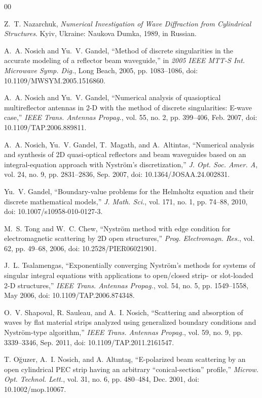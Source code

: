 \documentclass[conference]{IEEEtran}
\begin{document}
\begin{thebibliography}{00}

Z.~T. Nazarchuk, \emph{Numerical Investigation of Wave Diffraction from
Cylindrical Structures}. Kyiv, Ukraine: Naukova Dumka, 1989, in Russian.

A.~A. Nosich and Yu.~V. Gandel, ``Method of discrete singularities in the
accurate modeling of a reflector beam waveguide,'' in \emph{2005 IEEE MTT-S
Int. Microwave Symp. Dig.}, Long Beach, 2005, pp. 1083--1086,
doi: 10.1109/MWSYM.2005.1516860.

A.~A. Nosich and Yu.~V. Gandel, ``Numerical analysis of quasioptical
multireflector antennas in 2-D with the method of discrete singularities:
E-wave case,'' \emph{IEEE Trans. Antennas Propag.}, vol. 55, no. 2,
pp. 399--406, Feb. 2007, doi: 10.1109/TAP.2006.889811.

A.~A. Nosich, Yu.~V. Gandel, T.~Magath, and A.~Altintas, ``Numerical analysis
and synthesis of 2D quasi-optical reflectors and beam waveguides based on an
integral-equation approach with Nystr\"om's discretization,'' \emph{J. Opt.
Soc. Amer. A}, vol. 24, no. 9, pp. 2831--2836, Sep. 2007,
doi: 10.1364/JOSAA.24.002831.

Yu.~V. Gandel, ``Boundary-value problems for the Helmholtz equation and their
discrete mathematical models,'' \emph{J. Math. Sci.}, vol. 171, no. 1,
pp. 74--88, 2010, doi: 10.1007/s10958-010-0127-3.

M.~S. Tong and W.~C. Chew, ``Nystr\"om method with edge condition for
electromagnetic scattering by 2D open structures,'' \emph{Prog. Electromagn.
Res.}, vol. 62, pp. 49--68, 2006, doi: 10.2528/PIER06021901.

J.~L. Tsalamengas, ``Exponentially converging Nystr\"om's methods for systems
of singular integral equations with applications to open/closed strip- or
slot-loaded 2-D structures,'' \emph{IEEE Trans. Antennas Propag.}, vol. 54,
no. 5, pp. 1549--1558, May 2006, doi: 10.1109/TAP.2006.874348.

O.~V. Shapoval, R. Sauleau, and A.~I. Nosich, ``Scattering and absorption of
waves by flat material strips analyzed using generalized boundary conditions
and Nystr\"om-type algorithm,'' \emph{IEEE Trans. Antennas Propag.}, vol. 59,
no. 9, pp. 3339--3346, Sep. 2011, doi: 10.1109/TAP.2011.2161547.

T. O\u{g}uzer, A.~I. Nosich, and A. Alt\i nta\c{s}, ``E-polarized beam
scattering by an open cylindrical PEC strip having an arbitrary
``conical-section'' profile,'' \emph{Microw. Opt. Technol. Lett.}, vol. 31,
no. 6, pp. 480--484, Dec. 2001, doi: 10.1002/mop.10067.


\end{thebibliography}
\end{document}
